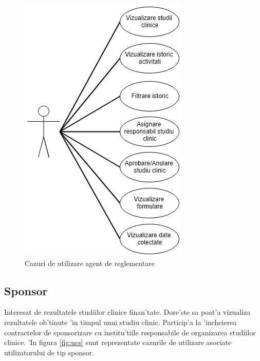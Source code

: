 \documentclass[12pt,a4paper,twoside]{report}
\begin{document}
	\begin{figure}[H]
		\begin{center}
			\includegraphics[scale=0.5]{img/uc_reg.PNG}
			\caption{Cazuri de utilizare agent de reglementare}
  			\label{fig:ucr}
  		\end{center}
  	\end{figure}

\subsection{Sponsor} 
    Interesat de rezultatele studiilor clinice finan'tate. Dore'ste sa poat'a vizualiza rezultatele ob'tinute 'in timpul unui studiu clinic. Particip'a la 'incheierea contractelor de sponsorizare cu institu'tiile responsabile de organizarea studiilor clinice. 'In figura \ref{fig:ucs} sunt reprezentate cazurile de utilizare asociate utilizatorului de tip sponsor.
\end{document}
